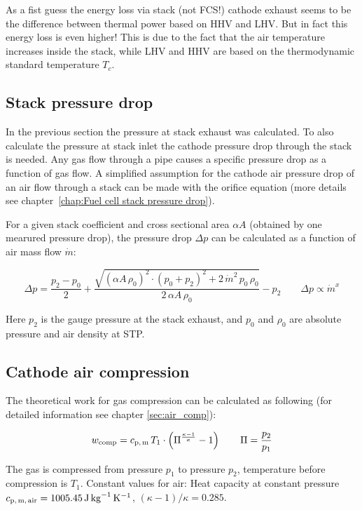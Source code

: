 \documentclass[11pt,a4paper,english,twoside]{scrreprt}
\begin{document}
As a fist guess the energy loss via stack (not FCS!) cathode exhaust seems to be the difference between thermal power based on HHV and LHV. But in fact this energy loss is even higher! This is due to the fact that the air temperature increases inside the stack, while LHV and HHV are based on the thermodynamic standard temperature $T_{c}$.


\subsection{Stack pressure drop}

In the previous section the pressure at stack exhaust was calculated. To also calculate the pressure at stack inlet the cathode pressure drop through the stack is needed. Any gas flow through a pipe causes a specific pressure drop as a function of gas flow. A simplified assumption for the cathode air pressure drop of an air flow through a stack can be made with the orifice equation (more details see chapter~\ref{chap:Fuel cell stack pressure drop}). 

For a given stack coefficient and cross sectional area $\alpha A$ (obtained by one mearured pressure drop), the pressure drop $\Delta p$ can be calculated as a function of air mass flow $\dot m$:
 
\begin{equation}
  \Delta p = \frac{p_2-p_0}{2} + \frac{\sqrt{(\alpha A\, \rho_0)^2 \cdot (p_0+p_2)^2 + 2\, \dot m^2\, p_0\, \rho_0}}{2\, \alpha A\, \rho_0} - p_2 \qquad 
  \Delta p \propto \dot m^x
\end{equation}

Here $p_2$ is the gauge pressure at the stack exhaust, and $p_0$ and $\rho_0$ are absolute pressure and air density at STP.


\subsection{Cathode air compression}

The theoretical work for gas compression can be calculated as following (for detailed information see chapter \ref{sec:air_comp}):

\[w_\text{comp} = c_\text{p,\,m} \, T_1 \cdot \left(\Pi ^{\frac{\kappa -1}{\kappa } } -1\right) \qquad \Pi = \frac{p_2}{p_1} \]

The gas is compressed from pressure $p_1$ to pressure $p_2$, temperature before compression is $T_1$. Constant values for air: Heat capacity at constant pressure $c_\text{p,\,m,\,air} =\SI{1005.45}{\joule\per\kilo\gram\per\kelvin}$, $(\kappa - 1)/\kappa = \num{0.285}$. 
 
\end{document}
